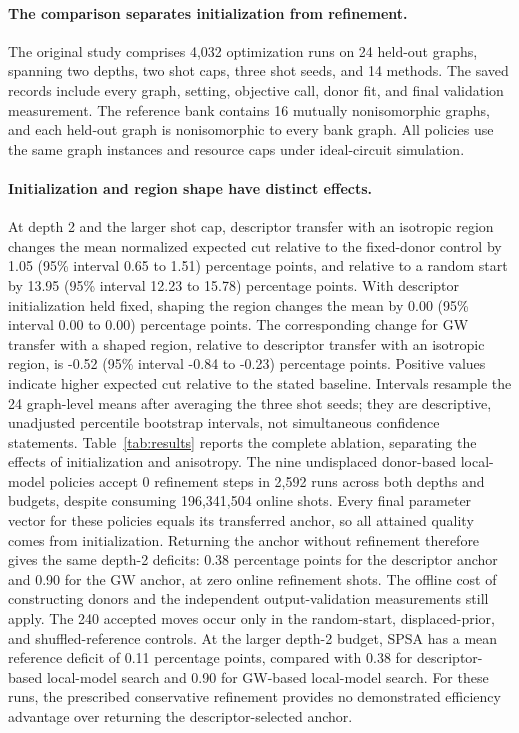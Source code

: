 \paragraph{The comparison separates initialization from refinement.}
The original study comprises 4,032 optimization runs on 24 held-out graphs, spanning two depths, two shot caps, three shot seeds, and 14 methods. The saved records include every graph, setting, objective call, donor fit, and final validation measurement. The reference bank contains 16 mutually nonisomorphic graphs, and each held-out graph is nonisomorphic to every bank graph. All policies use the same graph instances and resource caps under ideal-circuit simulation.
\paragraph{Initialization and region shape have distinct effects.}
At depth 2 and the larger shot cap, descriptor transfer with an isotropic region changes the mean normalized expected cut relative to the fixed-donor control by 1.05 (95\% interval 0.65 to 1.51) percentage points, and relative to a random start by 13.95 (95\% interval 12.23 to 15.78) percentage points. With descriptor initialization held fixed, shaping the region changes the mean by 0.00 (95\% interval 0.00 to 0.00) percentage points. The corresponding change for GW transfer with a shaped region, relative to descriptor transfer with an isotropic region, is -0.52 (95\% interval -0.84 to -0.23) percentage points. Positive values indicate higher expected cut relative to the stated baseline. Intervals resample the 24 graph-level means after averaging the three shot seeds; they are descriptive, unadjusted percentile bootstrap intervals, not simultaneous confidence statements. Table~\ref{tab:results} reports the complete ablation, separating the effects of initialization and anisotropy.
The nine undisplaced donor-based local-model policies accept 0 refinement steps in 2,592 runs across both depths and budgets, despite consuming 196,341,504 online shots. Every final parameter vector for these policies equals its transferred anchor, so all attained quality comes from initialization. Returning the anchor without refinement therefore gives the same depth-2 deficits: 0.38 percentage points for the descriptor anchor and 0.90 for the GW anchor, at zero online refinement shots. The offline cost of constructing donors and the independent output-validation measurements still apply. The 240 accepted moves occur only in the random-start, displaced-prior, and shuffled-reference controls. At the larger depth-2 budget, SPSA has a mean reference deficit of 0.11 percentage points, compared with 0.38 for descriptor-based local-model search and 0.90 for GW-based local-model search. For these runs, the prescribed conservative refinement provides no demonstrated efficiency advantage over returning the descriptor-selected anchor.
